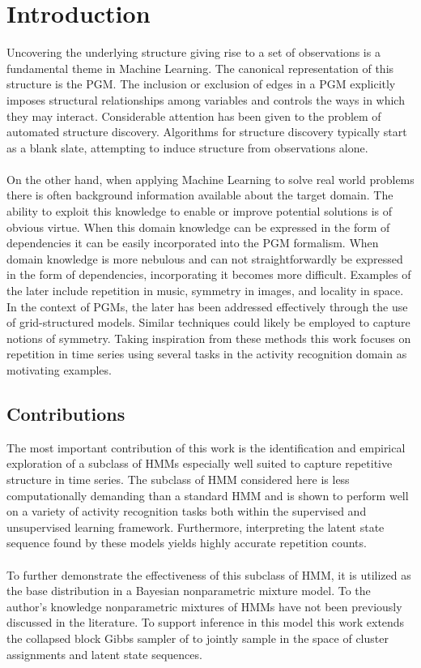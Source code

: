 \documentclass[12pt]{report}
\newcommand{\1}[0]{\mathbbm{1}}
\begin{document}
\chapter{Introduction}
Uncovering the underlying structure giving rise to a set of observations is a
fundamental theme in Machine Learning. The canonical representation of this structure
is the \ac{PGM}. The inclusion or exclusion of edges in a \ac{PGM} explicitly imposes
structural relationships among variables and controls the ways in which they may interact.
Considerable attention has been given to the problem of automated structure discovery.
Algorithms for structure discovery typically start as a blank slate, attempting to induce structure
from observations alone.
\\\\
On the other hand, when applying Machine Learning to solve real world problems there is
often background information available about the target domain. The ability to exploit
this knowledge to enable or improve potential solutions is of obvious virtue.
When this domain knowledge can be expressed in the form of dependencies
it can be easily incorporated into the \ac{PGM} formalism.
When domain knowledge is more nebulous and can not straightforwardly be expressed in the form
of dependencies, incorporating it becomes more difficult. Examples of the later include
repetition in music, symmetry in images, and locality in space.
In the context of \acp{PGM}, the later has been addressed effectively through the use of
grid-structured models. Similar techniques could likely be employed to capture notions
of symmetry. Taking inspiration from these methods this work focuses on repetition
in time series using several tasks in the activity recognition domain as motivating examples.

\section{Contributions}
The most important contribution of this work is the identification and empirical exploration of
a subclass of \acp{HMM} especially well suited to capture repetitive structure in time series.
The subclass of \ac{HMM} considered here is less computationally demanding than a standard \ac{HMM}
and is shown to perform well on a variety of activity recognition tasks both within the supervised
and unsupervised learning framework. Furthermore, interpreting the latent state sequence
found by these models yields highly accurate repetition counts.
\\\\
To further demonstrate the effectiveness of this subclass of \ac{HMM}, it is utilized as
the base distribution in a Bayesian nonparametric mixture model. To the author's knowledge
nonparametric mixtures of \acp{HMM} have not been previously discussed in the literature.
To support inference in this model this work extends the collapsed block Gibbs sampler
of \cite{pcfg-bayesian-johnson} to jointly sample in the space of cluster assignments and
latent state sequences.
\end{document}
